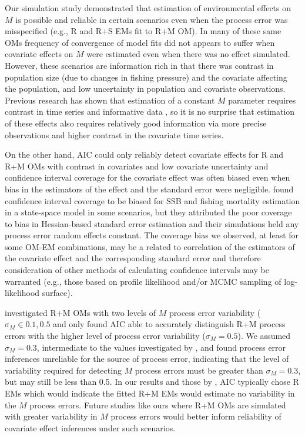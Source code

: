 \documentclass[
  12pt,
]{article}
\begin{document}
Our simulation study demonstrated that estimation of environmental effects on \(M\) is possible and reliable in certain scenarios even when the process error was misspecified (e.g., R and R+S EMs fit to R+M OM). In many of these same OMs frequency of convergence of model fits did not appears to suffer when covariate effects on \(M\) were estimated even when there was no effect simulated. However, these scenarios are information rich in that there was contrast in population size (due to changes in fishing pressure) and the covariate affecting the population, and low uncertainty in population and covariate observations. Previous research has shown that estimation of a constant \(M\) parameter requires contrast in time series and informative data \citep{leeetal11}, so it is no surprise that estimation of these effects also requires relatively good information via more precise observations and higher contrast in the covariate time series.

On the other hand, AIC could only reliably detect covariate effects for R and R+M OMs with contrast in covariates and low covariate uncertainty and confidence interval coverage for the covariate effect was often biased even when bias in the estimators of the effect and the standard error were negligible. \citet{cadiganetal24} found confidence interval coverage to be biased for SSB and fishing mortality estimation in a state-space model in some scenarios, but they attributed the poor coverage to bias in Hessian-based standard error estimation and their simulations held any process error random effects constant. The coverage bias we observed, at least for some OM-EM combinations, may be a related to correlation of the estimators of the covariate effect and the corresponding standard error and therefore consideration of other methods of calculating confidence intervals may be warranted (e.g., those based on profile likelihood and/or MCMC sampling of log-likelihood surface).

\citet{milleretal_inreview1} investigated R+M OMs with two levels of \(M\) process error variability (\(\sigma_M \in {0.1,0.5}\) and only found AIC able to accurately distinguish R+M process errors with the higher level of process error variability (\(\sigma_M = 0.5\)). We assumed \(\sigma_M = 0.3\), intermediate to the values investigated by \citet{milleretal_inreview1}, and found process error inferences unreliable for the source of process error, indicating that the level of variability required for detecting \(M\) process errors must be greater than \(\sigma_M = 0.3\), but may still be less than 0.5. In our results and those by \citet{milleretal_inreview1}, AIC typically chose R EMs which would indicate the fitted R+M EMs would estimate no variability in the \(M\) process errors. Future studies like ours where R+M OMs are simulated with greater variability in \(M\) process errors would better inform reliability of covariate effect inferences under such scenarios.
\end{document}
